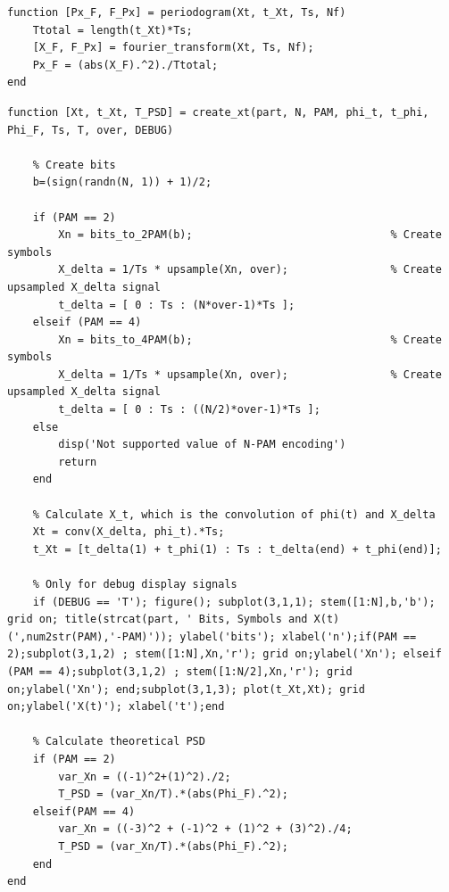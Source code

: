 \documentclass[11pt]{article}
\begin{document}
\begin{lstlisting}[caption = {\texttt{periodogram.m}}]
function [Px_F, F_Px] = periodogram(Xt, t_Xt, Ts, Nf)
    Ttotal = length(t_Xt)*Ts;
    [X_F, F_Px] = fourier_transform(Xt, Ts, Nf);
    Px_F = (abs(X_F).^2)./Ttotal;
end
\end{lstlisting}



\begin{lstlisting}[caption = {\texttt{create\_xt.m}}]
function [Xt, t_Xt, T_PSD] = create_xt(part, N, PAM, phi_t, t_phi, Phi_F, Ts, T, over, DEBUG)
    
    % Create bits
    b=(sign(randn(N, 1)) + 1)/2; 

    if (PAM == 2)
        Xn = bits_to_2PAM(b);                               % Create symbols 
        X_delta = 1/Ts * upsample(Xn, over);                % Create upsampled X_delta signal              
        t_delta = [ 0 : Ts : (N*over-1)*Ts ];
    elseif (PAM == 4)
        Xn = bits_to_4PAM(b);                               % Create symbols
        X_delta = 1/Ts * upsample(Xn, over);                % Create upsampled X_delta signal            
        t_delta = [ 0 : Ts : ((N/2)*over-1)*Ts ];
    else
        disp('Not supported value of N-PAM encoding')
        return
    end
    
    % Calculate X_t, which is the convolution of phi(t) and X_delta
    Xt = conv(X_delta, phi_t).*Ts;
    t_Xt = [t_delta(1) + t_phi(1) : Ts : t_delta(end) + t_phi(end)];
    
    % Only for debug display signals
    if (DEBUG == 'T'); figure(); subplot(3,1,1); stem([1:N],b,'b'); grid on; title(strcat(part, ' Bits, Symbols and X(t) (',num2str(PAM),'-PAM)')); ylabel('bits'); xlabel('n');if(PAM == 2);subplot(3,1,2) ; stem([1:N],Xn,'r'); grid on;ylabel('Xn'); elseif (PAM == 4);subplot(3,1,2) ; stem([1:N/2],Xn,'r'); grid on;ylabel('Xn'); end;subplot(3,1,3); plot(t_Xt,Xt); grid on;ylabel('X(t)'); xlabel('t');end
    
    % Calculate theoretical PSD
    if (PAM == 2)
        var_Xn = ((-1)^2+(1)^2)./2;
        T_PSD = (var_Xn/T).*(abs(Phi_F).^2);
    elseif(PAM == 4)
        var_Xn = ((-3)^2 + (-1)^2 + (1)^2 + (3)^2)./4;
        T_PSD = (var_Xn/T).*(abs(Phi_F).^2);
    end
end
\end{lstlisting}
\end{document}
